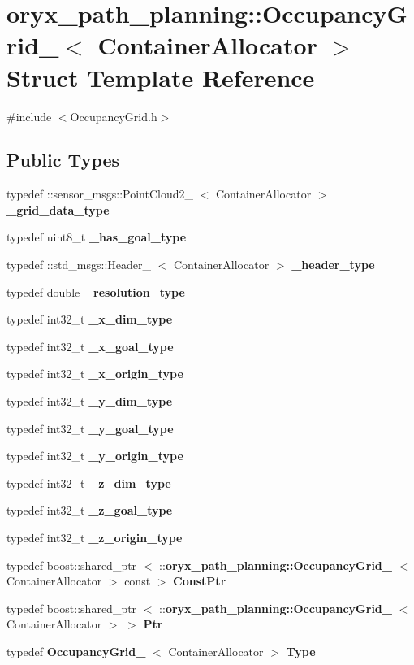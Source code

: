 \section{oryx\-\_\-path\-\_\-planning\-:\-:\-Occupancy\-Grid\-\_\-$<$ \-Container\-Allocator $>$ \-Struct \-Template \-Reference}
\label{structoryx__path__planning_1_1OccupancyGrid__}


{\ttfamily \#include $<$\-Occupancy\-Grid.\-h$>$}

\subsection*{\-Public \-Types}
\begin{DoxyCompactItemize}
\item 
typedef \*
\-::sensor\-\_\-msgs\-::\-Point\-Cloud2\-\_\-\*
$<$ \-Container\-Allocator $>$ {\bf \-\_\-grid\-\_\-data\-\_\-type}
\item 
typedef uint8\-\_\-t {\bf \-\_\-has\-\_\-goal\-\_\-type}
\item 
typedef \-::std\-\_\-msgs\-::\-Header\-\_\-\*
$<$ \-Container\-Allocator $>$ {\bf \-\_\-header\-\_\-type}
\item 
typedef double {\bf \-\_\-resolution\-\_\-type}
\item 
typedef int32\-\_\-t {\bf \-\_\-x\-\_\-dim\-\_\-type}
\item 
typedef int32\-\_\-t {\bf \-\_\-x\-\_\-goal\-\_\-type}
\item 
typedef int32\-\_\-t {\bf \-\_\-x\-\_\-origin\-\_\-type}
\item 
typedef int32\-\_\-t {\bf \-\_\-y\-\_\-dim\-\_\-type}
\item 
typedef int32\-\_\-t {\bf \-\_\-y\-\_\-goal\-\_\-type}
\item 
typedef int32\-\_\-t {\bf \-\_\-y\-\_\-origin\-\_\-type}
\item 
typedef int32\-\_\-t {\bf \-\_\-z\-\_\-dim\-\_\-type}
\item 
typedef int32\-\_\-t {\bf \-\_\-z\-\_\-goal\-\_\-type}
\item 
typedef int32\-\_\-t {\bf \-\_\-z\-\_\-origin\-\_\-type}
\item 
typedef boost\-::shared\-\_\-ptr\*
$<$ \-::{\bf oryx\-\_\-path\-\_\-planning\-::\-Occupancy\-Grid\-\_\-}\*
$<$ \-Container\-Allocator $>$ const  $>$ {\bf \-Const\-Ptr}
\item 
typedef boost\-::shared\-\_\-ptr\*
$<$ \-::{\bf oryx\-\_\-path\-\_\-planning\-::\-Occupancy\-Grid\-\_\-}\*
$<$ \-Container\-Allocator $>$ $>$ {\bf \-Ptr}
\item 
typedef {\bf \-Occupancy\-Grid\-\_\-}\*
$<$ \-Container\-Allocator $>$ {\bf \-Type}
\end{DoxyCompactItemize}
